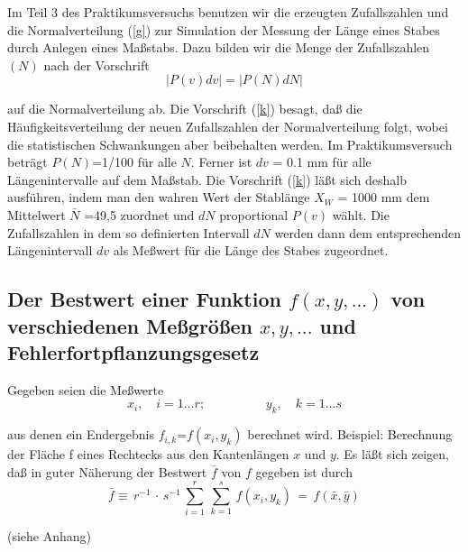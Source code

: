 Im Teil 3 des Praktikumsversuchs benutzen wir die erzeugten
Zufallszahlen und die Normalverteilung (\ref{g}) zur Simulation der
Messung der Länge eines Stabes durch Anlegen eines Maßstabs. Dazu
bilden wir die Menge der Zufallszahlen $(N)$ nach der Vorschrift\\

\begin{equation} \label{k}
  | P(v)dv| = | P(N) dN |
\end{equation}

auf die Normalverteilung ab. Die Vorschrift (\ref{k}) besagt, daß die
Häufigkeitsverteilung der neuen Zufallszahlen der Normalverteilung
folgt, wobei die statistischen Schwankungen aber beibehalten werden. Im
Praktikumsversuch beträgt $P(N)$=1/100 für alle $N$. Ferner ist $dv$ =
0.1 mm für alle Längenintervalle auf dem Maßstab. Die Vorschrift
(\ref{k}) läßt sich deshalb ausführen, indem man den wahren Wert der
Stablänge $X_W$ = 1000 mm dem Mittelwert $\bar N$ =49,5 zuordnet und
$dN$ proportional $P(v)$ wählt. Die Zufallszahlen in dem so definierten
Intervall $dN$ werden dann dem entsprechenden Längenintervall $dv$ als
Meßwert für die Länge des Stabes zugeordnet.


\subsection{Der Bestwert einer Funktion $f(x,y,...)$ von verschiedenen
Meßgrößen $x,y,...$ und Fehlerfortpflanzungsgesetz}


Gegeben seien die Meßwerte\\

\begin{equation} \label{l}
x_{i},\quad i=1\ldots r;\hspace{2cm}
y_{k},\quad k=1\ldots s
\end{equation}

aus denen ein Endergebnis $f_{i,k}$=$f(x_{i},y_{k})$ berechnet wird.
Beispiel: Berechnung der Fläche {f} eines Rechtecks aus den
Kantenlängen $x$ und $y$. Es läßt sich zeigen, daß in guter Näherung
der Bestwert $\bar f$ von $f$ gegeben ist durch\\

\begin{equation} \label{m}
\bar
f\equiv\,r^{-1}\,\cdot\,s^{-1}\,\sum_{i=1}^{r}\,\sum_{k=1}^{s}\,f(x_{i},
y_{k})\,=\,f(\bar x, \bar y)
\end{equation}

(siehe Anhang)\\


